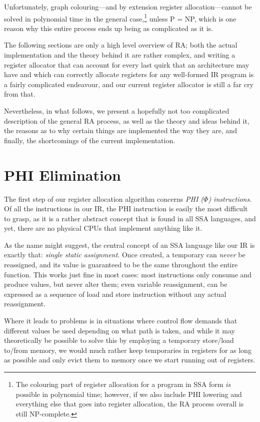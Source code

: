 \documentclass[12pt]{report}
\begin{document}
Unfortunately, graph colouring—and by extension register allocation—cannot be solved in polynomial time in the general
case,\footnote{The colouring part of register allocation for a program in SSA form \textit{is} possible in polynomial time; however, if we
also include PHI lowering and everything else that goes into register allocation, the RA process overall is still NP-complete.} unless
P = NP, which is one reason why this entire process ends up being as complicated as it is.

The following sections are only a high level overview of RA; both the actual implementation and the theory behind it are rather complex,
and writing a register allocator that can account for every last quirk that an architecture may have and which can correctly allocate
registers for any well-formed IR program is a fairly complicated endeavour, and our current register allocator is still a far cry from that.

Nevertheless, in what follows, we present a hopefully not too complicated description of the general RA process, as well as the theory
and ideas behind it, the reasons as to why certain things are implemented the way they are, and finally, the shortcomings of the current
implementation.

\section{PHI Elimination}
The first step of our register allocation algorithm concerns \textit{PHI ($\Phi$) instructions}. Of all the instructions in our IR, the PHI
instruction is easily the most difficult to grasp, as it is a rather abstract concept that is found in all SSA languages, and yet, there
are no physical CPUs that implement anything like it.

As the name might suggest, the central concept of an SSA language like our IR is exactly that: \textit{single static assignment}. Once
created, a temporary can \textit{never} be reassigned, and its value is guaranteed to be the same throughout the entire function. This
works just fine in most cases: most instructions only consume and produce values, but never alter them; even variable reassignment,
can be expressed as a sequence of load and store instruction without any actual reassignment.

Where it leads to problems is in situations where control flow demands that different values be used depending on what path is taken,
and while it may theoretically be possible to solve this by employing a temporary store/load to/from memory, we would much rather keep
temporaries in registers for as long as possible and only evict them to memory once we start running out of registers.
\end{document}
